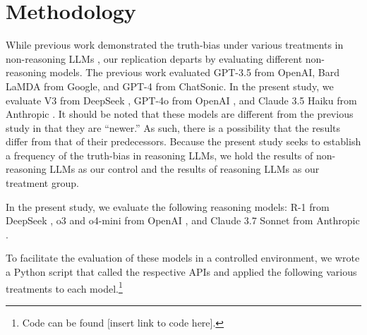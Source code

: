 \documentclass{article}
\begin{document}

\section{Methodology}

While previous work demonstrated the truth-bias under various treatments in non-reasoning LLMs \citep{markowitz_generative_2024}, our replication departs by evaluating different non-reasoning models. The previous work evaluated GPT-3.5 from OpenAI, Bard LaMDA from Google, and GPT-4 from ChatSonic. In the present study, we evaluate V3 from DeepSeek \citep{deepseekai2025deepseekv3technicalreport}, GPT-4o from OpenAI \citep{openai2024gpt4ocard}, and Claude 3.5 Haiku from Anthropic \citep{anthropic_claude_2024}. It should be noted that these models are different from the previous study in that they are ``newer.'' As such, there is a possibility that the results differ from that of their predecessors. Because the present study seeks to establish a frequency of the truth-bias in reasoning LLMs, we hold the results of non-reasoning LLMs as our control and the results of reasoning LLMs as our treatment group.


In the present study, we evaluate the following reasoning models: R-1 from DeepSeek \citep{deepseek-ai_deepseek-r1_2025}, o3 and o4-mini from OpenAI \citep{openai_openai_2024}, and Claude 3.7 Sonnet from Anthropic \citep{anthropic_claude_2025}.

To facilitate the evaluation of these models in a controlled environment, we wrote a Python script that called the respective APIs and applied the following various treatments to each model.\footnote{Code can be found [insert link to code here].} %
\end{document}
